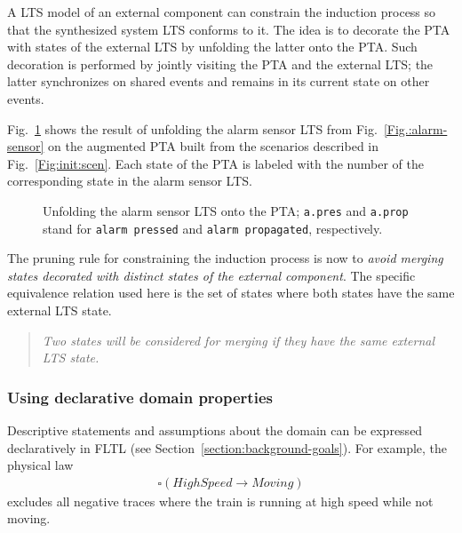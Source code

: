 A LTS model of an external component can constrain the induction process so that the synthesized system LTS conforms to it. The idea is to decorate the PTA with states of the external LTS by unfolding the latter onto the PTA. Such decoration is performed by jointly visiting the PTA and the external LTS; the latter synchronizes on shared events and remains in its current state on other events.

Fig.~\ref{Fig.:alarm-unfolded-pta} shows the result of unfolding the alarm sensor LTS from Fig.~\ref{Fig.:alarm-sensor} on the augmented PTA built from the scenarios described in Fig.~\ref{Fig:init:scen}. Each state of the PTA is labeled with the number of the corresponding state in the alarm sensor LTS. 

\begin{figure}
\centering
{}
\caption{Unfolding the alarm sensor LTS onto the PTA; \texttt{a.pres} and \texttt{a.prop} stand for \texttt{alarm pressed} and \texttt{alarm propagated}, respectively\label{Fig.:alarm-unfolded-pta}.}
\end{figure}

The pruning rule for constraining the induction process is now to \emph{avoid merging states decorated with distinct states of the external component}. The specific equivalence relation used here is the set of states where both states have the same external LTS state. 

\begin{quote}
\emph{Two states will be considered for merging if they have the same external LTS state.}
\end{quote}


\subsubsection*{Using declarative domain properties}

Descriptive statements and assumptions about the domain can be expressed declaratively in FLTL (see Section~\ref{section:background-goals}). For example, the physical law
\begin{align*}
\square(HighSpeed \rightarrow Moving)
\end{align*}
\noindent excludes all negative traces where the train is running at high speed while not moving. 

